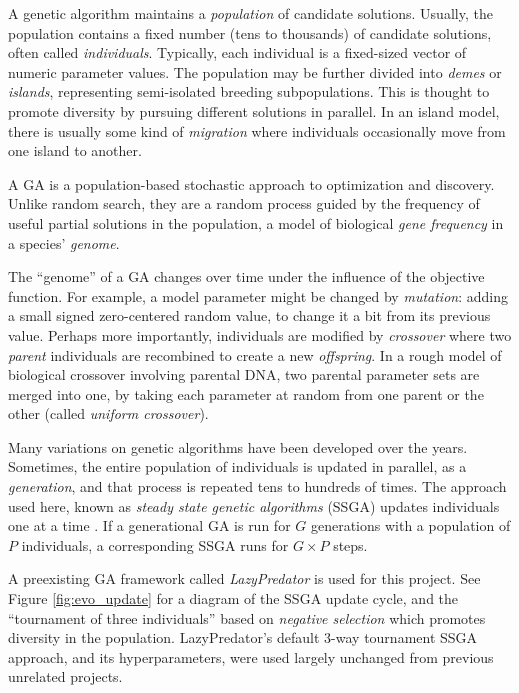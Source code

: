 \documentclass[letterpaper]{article}
\begin{document}
A genetic algorithm maintains a \textit{population} of candidate solutions. Usually, the population contains a fixed number (tens to thousands) of candidate solutions, often called \textit{individuals}. Typically, each individual is a fixed-sized vector of numeric parameter values. The population may be further divided into \textit{demes} or \textit{islands}, representing semi-isolated breeding subpopulations. This is thought to promote diversity by pursuing different solutions in parallel. In an island model, there is usually some kind of \textit{migration} where individuals occasionally move from one island to another.

A GA is a population-based stochastic approach to optimization and discovery. Unlike random search, they are a random process guided by the frequency of useful partial solutions in the population, a model of biological \textit{gene frequency} in a species' \textit{genome}.

The ``genome'' of a GA changes over time under the influence of the objective function. For example, a model parameter might be changed by \textit{mutation}: adding a small signed zero-centered random value, to change it a bit from its previous value. Perhaps more importantly, individuals are modified by \textit{crossover} where two \textit{parent} individuals are recombined to create a new \textit{offspring}. In a rough model of biological crossover involving parental DNA, two parental parameter sets are merged into one, by taking each parameter at random from one parent or the other (called \textit{uniform crossover}).

Many variations on genetic algorithms have been developed over the years. Sometimes, the entire population of individuals is updated in parallel, as a \textit{generation}, and that process is repeated tens to hundreds of times. The approach used here, known as \textit{steady state genetic algorithms} (SSGA) updates individuals one at a time \citep{syswerda_study_1991}. If a generational GA is run for $G$ generations with a population of $P$ individuals, a corresponding SSGA runs for $G{\times}P$ steps. 

A preexisting GA framework called \textit{LazyPredator} is used for this project. See Figure \ref{fig:evo_update} for a diagram of the SSGA update cycle, and the ``tournament of three individuals'' based on \textit{negative selection} which promotes diversity in the population. LazyPredator's default 3-way tournament SSGA approach, and its hyperparameters, were used largely unchanged from previous unrelated projects.
\end{document}
